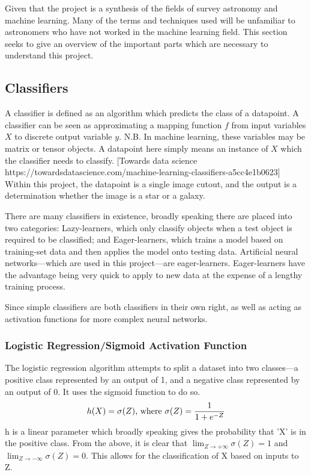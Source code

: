 \documentclass[a4paper,fleqn,usenatbib]{mnras}
\begin{document}
Given that the project is a synthesis of the fields of survey astronomy and machine learning. Many of the terms and techniques used will be unfamiliar to astronomers who have not worked in the machine learning field. This section seeks to give an overview of the important parts which are necessary to understand this project. 
\subsection{Classifiers}

A classifier is defined as an algorithm which predicts the class of a datapoint. A classifier can be seen as approximating a mapping function $f$ from input variables $X$ to discrete output variable $y$. N.B. In machine learning, these variables may be matrix or tensor objects. A datapoint here simply means an instance of $X$ which the classifier needs to classify. [Towards data science https://towardsdatascience.com/machine-learning-classifiers-a5cc4e1b0623] Within this project, the datapoint is a single image cutout, and the output is a determination whether the image is a star or a galaxy. 

There are many classifiers in existence, broadly speaking there are placed into two categories: Lazy-learners, which only classify objects when a test object is required to be classified; and Eager-learners, which trains a model based on training-set data and then applies the model onto testing data. Artificial neural networks---which are used in this project---are eager-learners. Eager-learners have the advantage being very quick to apply to new data at the expense of a lengthy training process. 

Since simple classifiers are both classifiers in their own right, as well as acting as activation functions for more complex neural networks. 
\subsubsection{Logistic Regression/Sigmoid Activation Function}
The logistic regression algorithm attempts to split a dataset into two classes---a positive class represented by an output of 1, and a negative class represented by an output of 0. It uses the sigmoid function to do so.
\begin{equation}
h(X)=\sigma(Z) \textnormal{, where } \sigma(Z)=\frac{1}{1+e^{-Z}}
\end{equation}
h is a linear parameter which broadly speaking gives the probability that 'X' is in the positive class. 
From the above, it is clear that $\lim_{Z \to +\infty} \sigma(Z)=1$ and $\lim_{Z \to -\infty} \sigma(Z)=0$. This allows for the classification of X based on inputs to Z. 
\end{document}
